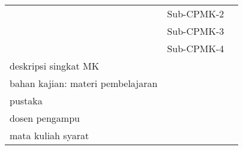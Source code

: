 \documentclass[12pt, landscape]{simrep} %
\begin{document}
\begin{longtable}{*{8}{P{1.15in}}@{}}
	                                           & Sub-CPMK-2                                                   &                                                                                                       \\
	                                           & Sub-CPMK-3                                                   &                                                                                                       \\
	                                           & Sub-CPMK-4                                                   &                                                                                                       \\
                                               \midrule
	deskripsi singkat MK                       &                                                                                                                                                                      \\

                                               \midrule

	bahan kajian: materi pembelajaran          &                                                                                                                                                                      \\
                                               \midrule
	pustaka                                    &                                                                                                                                                                        \\
                                               \midrule

	dosen pengampu                             &                                                                                                                                                                  \\
                                               \midrule
	mata kuliah syarat                         &                                                                                                                                                                      \\
	\bottomrule
\end{longtable}










\end{document}
